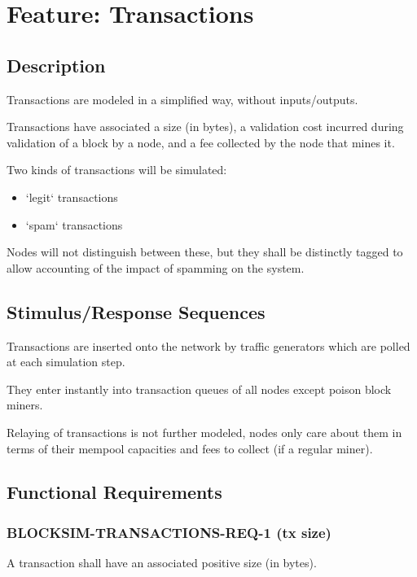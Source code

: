 \documentclass{scrreprt}
\begin{document}
\section{Feature: Transactions}

\subsection{Description}

Transactions are modeled in a simplified way, without inputs/outputs.

Transactions have associated a size (in bytes), a validation cost incurred
during validation of a block by a node, and a fee collected by the node that
mines it.

Two kinds of transactions will be simulated:

\begin{itemize}
   \item `legit` transactions
   \item `spam` transactions
\end{itemize}

Nodes will not distinguish between these, but they shall be distinctly
tagged to allow accounting of the impact of spamming on the system.


\subsection{Stimulus/Response Sequences}

Transactions are inserted onto the network by traffic generators which are
polled at each simulation step.

They enter instantly into transaction queues of all nodes except poison block
miners.

Relaying of transactions is not further modeled, nodes only care about
them in terms of their mempool capacities and fees to collect
(if a regular miner).


\subsection{Functional Requirements}

\subsubsection{BLOCKSIM-TRANSACTIONS-REQ-1 (tx size)}

A transaction shall have an associated positive size (in bytes).
\end{document}

